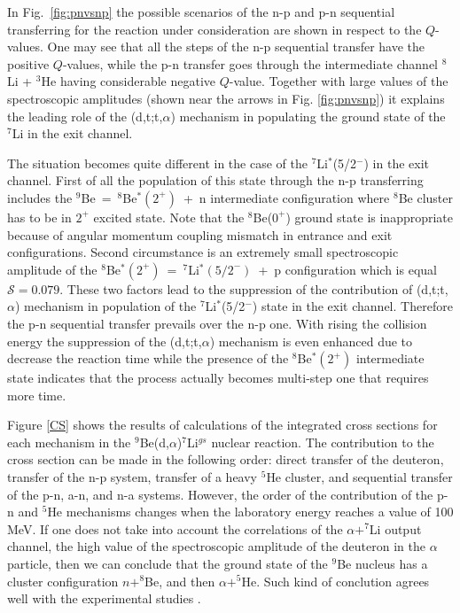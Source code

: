 \documentclass[10pt]{iopart}
\begin{document}
In Fig.~\ref{fig:pnvsnp} the possible scenarios of the n-p and p-n sequential transferring for the reaction under consideration are shown in respect to the $Q$-values. One may see that all the steps of the n-p sequential transfer have the positive $Q$-values, while the p-n transfer goes through the intermediate channel ${}^8$Li + ${}^3$He having considerable negative $Q$-value. Together with large values of the spectroscopic amplitudes (shown near the arrows in Fig. \ref{fig:pnvsnp}) it explains the leading role of the (d,t;t,$\alpha$) mechanism in populating the ground state of the ${}^7$Li in the exit channel.

The situation becomes quite different in the case of the ${}^7$Li$^*$(5/2$^-$) in the exit channel. First of all the population of this state through the n-p transferring includes the ${}^9$Be~=~${}^8$Be$^*(2^+)$~+~n intermediate configuration where ${}^8$Be cluster has to be in $2^+$ excited state. Note that the ${}^8$Be($0^+$) ground state is inappropriate because of angular momentum coupling mismatch in entrance and exit configurations. Second circumstance is an extremely small spectroscopic amplitude of the ${}^8$Be$^*(2^+)$~=~${}^7$Li$^*(5/2^-)$~+~p configuration which is equal $\mathcal{S} = 0.079$. These two factors lead to the suppression of the contribution of (d,t;t,$\alpha$) mechanism in population of the ${}^7$Li$^*$(5/2$^-$) state in the exit channel. Therefore the p-n sequential transfer prevails over the n-p one. With rising the collision energy the suppression of the (d,t;t,$\alpha$) mechanism is even enhanced due to decrease the reaction time while the presence of the ${}^8$Be$^*(2^+)$ intermediate state indicates that the process actually becomes multi-step one that requires more time.

Figure \ref{CS} shows the results of calculations of the integrated cross sections for each mechanism in the ${}^9$Be(d,$\alpha$)${}^7$Li$^{gs}$ nuclear reaction. The contribution to the cross section can be made in the following order: direct transfer of the deuteron, transfer of the n-p system, transfer of a heavy ${}^5$He cluster,  and sequential transfer of the p-n, a-n, and n-a systems. However, the order of the contribution of the p-n and ${}^5$He mechanisms changes when the laboratory energy reaches a value of 100 MeV. If one does not take into account the correlations of the $\alpha+^7$Li output channel, the high value of the spectroscopic amplitude of the deuteron in the $\alpha$ particle, then we can conclude that the ground state of the $^9$Be nucleus has a cluster configuration $n+^8$Be, and then $\alpha+^5$He. Such kind of conclution agrees well with the experimental studies \cite{brown2007, papka2007}.
\end{document}
